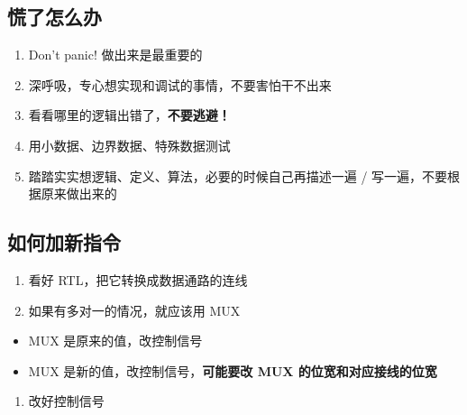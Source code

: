 \documentclass[12pt,AutoFakeBold]{article}
\providecommand{\tightlist}{%
  \setlength{\itemsep}{0pt}\setlength{\parskip}{0pt}}
\begin{document}
\hypertarget{ux614cux4e86ux600eux4e48ux529e}{%
\subsection{慌了怎么办}\label{ux614cux4e86ux600eux4e48ux529e}}

\begin{enumerate}
\def\labelenumi{\arabic{enumi}.}
\tightlist
\item
  Don't panic! 做出来是最重要的
\item
  深呼吸，专心想实现和调试的事情，不要害怕干不出来
\item
  看看哪里的逻辑出错了，\textbf{不要逃避！}
\item
  用小数据、边界数据、特殊数据测试
\item
  踏踏实实想逻辑、定义、算法，必要的时候自己再描述一遍 /
  写一遍，不要根据原来做出来的
\end{enumerate}

\hypertarget{ux5982ux4f55ux52a0ux65b0ux6307ux4ee4}{%
\subsection{如何加新指令}\label{ux5982ux4f55ux52a0ux65b0ux6307ux4ee4}}

\begin{enumerate}
\def\labelenumi{\arabic{enumi}.}
\tightlist
\item
  看好 RTL，把它转换成数据通路的连线
\item
  如果有多对一的情况，就应该用 MUX
\end{enumerate}

\begin{itemize}
\tightlist
\item
  MUX 是原来的值，改控制信号
\item
  MUX 是新的值，改控制信号，\textbf{可能要改 MUX 的位宽和对应接线的位宽}
\end{itemize}

\begin{enumerate}
\def\labelenumi{\arabic{enumi}.}
\setcounter{enumi}{2}
\tightlist
\item
  改好控制信号
\end{enumerate}
\end{document}

